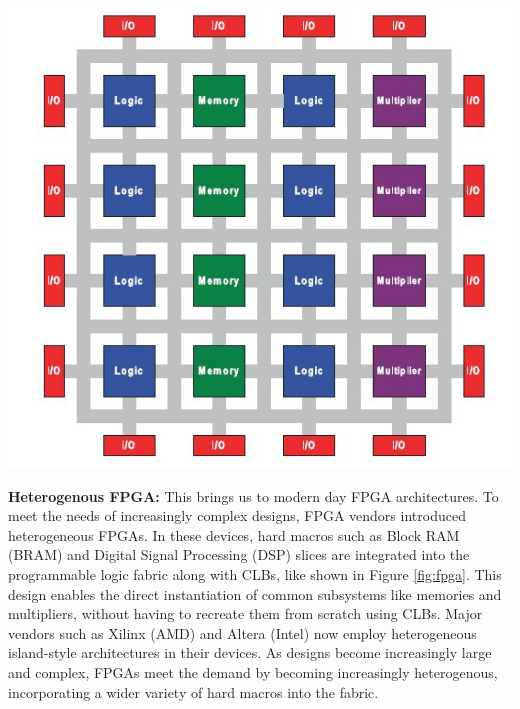 {
    \centering
    \includegraphics[width=\columnwidth]{figures/heterogenous_fpga_3.jpg}
    \label{fig:fpga}
}
\vspace{0.25cm}

\textbf{Heterogenous FPGA:} \quad 
This brings us to modern day FPGA architectures. 
To meet the needs of increasingly complex designs, FPGA vendors introduced heterogeneous FPGAs. 
In these devices, hard macros such as Block RAM (BRAM) and Digital Signal Processing (DSP) slices are integrated into the programmable logic fabric along with CLBs, like shown in Figure \ref{fig:fpga}. 
This design enables the direct instantiation of common subsystems like memories and multipliers, without having to recreate them from scratch using CLBs. 
Major vendors such as Xilinx (AMD) and Altera (Intel) now employ heterogeneous island-style architectures in their devices. 
As designs become increasingly large and complex, FPGAs meet the demand by becoming increasingly heterogenous, incorporating a wider variety of hard macros into the fabric. 


